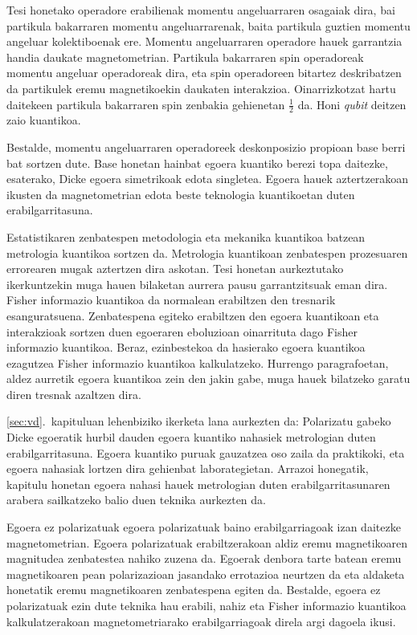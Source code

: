 Tesi honetako operadore erabilienak momentu angeluarraren osagaiak dira, bai partikula bakarraren momentu angeluarrarenak, baita partikula guztien momentu angeluar kolektiboenak ere.
Momentu angeluarraren operadore hauek garrantzia handia daukate magnetometrian.
Partikula bakarraren spin operadoreak momentu angeluar operadoreak dira, eta spin operadoreen bitartez deskribatzen da partikulek eremu magnetikoekin daukaten interakzioa.
Oinarrizkotzat hartu daitekeen partikula bakarraren spin zenbakia gehienetan $\frac{1}{2}$ da.
Honi \emph{qubit} deitzen zaio kuantikoa.

Bestalde, momentu angeluarraren operadoreek deskonposizio propioan base berri bat sortzen dute.
Base honetan hainbat egoera kuantiko berezi topa daitezke, esaterako, Dicke egoera simetrikoak edota singletea.
Egoera hauek aztertzerakoan ikusten da magnetometrian edota beste teknologia kuantikoetan duten erabilgarritasuna.

Estatistikaren zenbatespen metodologia eta mekanika kuantikoa batzean metrologia kuantikoa sortzen da.
Metrologia kuantikoan zenbatespen prozesuaren errorearen mugak aztertzen dira askotan.
Tesi honetan aurkeztutako ikerkuntzekin muga hauen bilaketan aurrera pausu garrantzitsuak eman dira.
Fisher informazio kuantikoa da normalean erabiltzen den tresnarik esanguratsuena.
Zenbatespena egiteko erabiltzen den egoera kuantikoan eta interakzioak sortzen duen egoeraren eboluzioan oinarrituta dago Fisher informazio kuantikoa.
Beraz, ezinbestekoa da hasierako egoera kuantikoa ezagutzea Fisher informazio kuantikoa kalkulatzeko.
Hurrengo paragrafoetan, aldez aurretik egoera kuantikoa zein den jakin gabe, muga hauek bilatzeko garatu diren tresnak azaltzen dira.

\ref{sec:vd}.~kapituluan lehenbiziko ikerketa lana aurkezten da: Polarizatu gabeko Dicke egoeratik hurbil dauden egoera kuantiko nahasiek metrologian duten erabilgarritasuna.
Egoera kuantiko puruak gauzatzea oso zaila da praktikoki, eta egoera nahasiak lortzen dira gehienbat laborategietan.
Arrazoi honegatik, kapitulu honetan egoera nahasi hauek metrologian duten erabilgarritasunaren arabera sailkatzeko balio duen teknika aurkezten da.

Egoera ez polarizatuak egoera polarizatuak baino erabilgarriagoak izan daitezke magnetometrian.
Egoera polarizatuak erabiltzerakoan aldiz eremu magnetikoaren magnitudea zenbatestea nahiko zuzena da.
Egoerak denbora tarte batean eremu magnetikoaren pean polarizazioan jasandako  errotazioa neurtzen da eta aldaketa honetatik eremu magnetikoaren zenbatespena egiten da.
Bestalde, egoera ez polarizatuak ezin dute teknika hau erabili, nahiz eta Fisher informazio kuantikoa kalkulatzerakoan magnetometriarako erabilgarriagoak direla argi dagoela ikusi.

